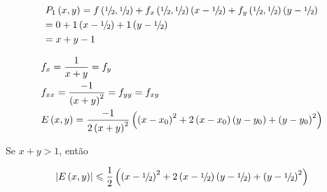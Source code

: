 \documentclass{book}
\begin{document}
\begin{sol}
\[
\begin{gathered}
P_1 \left( {x,y} \right) = f\left( {{\raise0.5ex\hbox{$\scriptstyle 1$}
\kern-0.1em/\kern-0.15em
\lower0.25ex\hbox{$\scriptstyle 2$}},{\raise0.5ex\hbox{$\scriptstyle 1$}
\kern-0.1em/\kern-0.15em
\lower0.25ex\hbox{$\scriptstyle 2$}}} \right) + f_x \left( {{\raise0.5ex\hbox{$\scriptstyle 1$}
\kern-0.1em/\kern-0.15em
\lower0.25ex\hbox{$\scriptstyle 2$}},{\raise0.5ex\hbox{$\scriptstyle 1$}
\kern-0.1em/\kern-0.15em
\lower0.25ex\hbox{$\scriptstyle 2$}}} \right)\left( {x - {\raise0.5ex\hbox{$\scriptstyle 1$}
\kern-0.1em/\kern-0.15em
\lower0.25ex\hbox{$\scriptstyle 2$}}} \right) + f_y \left( {{\raise0.5ex\hbox{$\scriptstyle 1$}
\kern-0.1em/\kern-0.15em
\lower0.25ex\hbox{$\scriptstyle 2$}},{\raise0.5ex\hbox{$\scriptstyle 1$}
\kern-0.1em/\kern-0.15em
\lower0.25ex\hbox{$\scriptstyle 2$}}} \right)\left( {y - {\raise0.5ex\hbox{$\scriptstyle 1$}
\kern-0.1em/\kern-0.15em
\lower0.25ex\hbox{$\scriptstyle 2$}}} \right) \hfill \\
= 0 + 1\left( {x - {\raise0.5ex\hbox{$\scriptstyle 1$}
\kern-0.1em/\kern-0.15em
\lower0.25ex\hbox{$\scriptstyle 2$}}} \right) + 1\left( {y - {\raise0.5ex\hbox{$\scriptstyle 1$}
\kern-0.1em/\kern-0.15em
\lower0.25ex\hbox{$\scriptstyle 2$}}} \right) \hfill \\
= x + y - 1 \hfill \\
\end{gathered}
\]

\[
\begin{gathered}
f_x  = \frac{1}
{{x + y}} = f_y  \hfill \\
f_{xx}  = \frac{{ - 1}}
{{\left( {x + y} \right)^2 }} = f_{yy}  = f_{xy}  \hfill \\
E\left( {x,y} \right) = \frac{{ - 1}}
{{2\left( {x + y} \right)^2 }}\left( {\left( {x - x_0 } \right)^2  + 2\left( {x - x_0 } \right)\left( {y - y_0 } \right) + \left( {y - y_0 } \right)^2 } \right) \hfill \\
\end{gathered}
\]

Se $x + y > 1$, ent\~ao

\[
\left| {E\left( {x,y} \right)} \right| \leqslant \frac{1}
{2}\left( {\left( {x - {\raise0.5ex\hbox{$\scriptstyle 1$}
\kern-0.1em/\kern-0.15em
\lower0.25ex\hbox{$\scriptstyle 2$}}} \right)^2  + 2\left( {x - {\raise0.5ex\hbox{$\scriptstyle 1$}
\kern-0.1em/\kern-0.15em
\lower0.25ex\hbox{$\scriptstyle 2$}}} \right)\left( {y - {\raise0.5ex\hbox{$\scriptstyle 1$}
\kern-0.1em/\kern-0.15em
\lower0.25ex\hbox{$\scriptstyle 2$}}} \right) + \left( {y - {\raise0.5ex\hbox{$\scriptstyle 1$}
\kern-0.1em/\kern-0.15em
\lower0.25ex\hbox{$\scriptstyle 2$}}} \right)^2 } \right)
\]


\end{sol}
\end{document}
